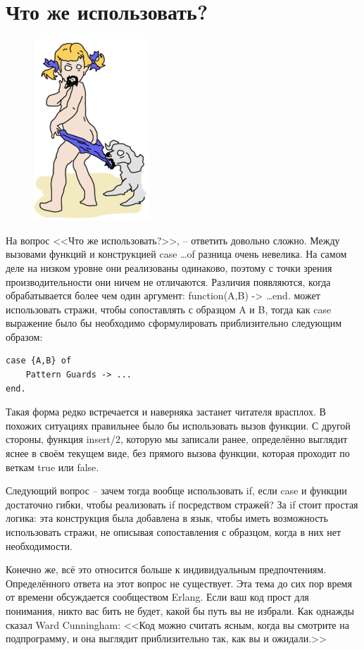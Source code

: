 \documentclass[a4paper,12pt]{report}
\newcommand{\ops}{\colorbox{lgreen}}
\begin{document}
\section{Что же использовать?}
\begin{figure}[h!]
    \includegraphics[width=0.3\linewidth]{coppertone.png}
\end{figure}
На вопрос <<Что же использовать?>>, \--- ответить довольно сложно. Между вызовами функций и конструкцией \ops{case \ldots of} разница очень невелика. На самом деле на низком уровне они реализованы одинаково, поэтому с точки зрения производительности они ничем не отличаются. Различия появляются, когда обрабатывается более чем один аргумент: \ops{function(A,B) -> \ldots end.} может использовать стражи, чтобы сопоставлять  с образцом A и B, тогда как case выражение было бы необходимо сформулировать приблизительно следующим образом:
\begin{lstlisting}[style=erlang]
case {A,B} of
    Pattern Guards -> ...
end.
\end{lstlisting}

Такая форма редко встречается и наверняка застанет читателя врасплох. В похожих ситуациях правильнее было бы использовать вызов функции. С другой стороны, функция \ops{insert/2}, которую мы записали ранее, определённо выглядит яснее в своём текущем виде, без прямого вызова функции, которая проходит по веткам \ops{true} или \ops{false}.

Следующий вопрос \--- зачем тогда вообще использовать \ops{if}, если \ops{case} и функции достаточно гибки, чтобы реализовать \ops{if} посредством стражей? За \ops{if} стоит простая логика: эта конструкция была добавлена в язык, чтобы иметь возможность использовать стражи, не описывая сопоставления с образцом, когда в них нет необходимости.

Конечно же, всё это относится больше к индивидуальным предпочтениям. Определённого ответа на этот вопрос не существует. Эта тема до сих пор время от времени обсуждается сообществом Erlang. Если ваш код прост для понимания, никто вас бить не будет, какой бы путь вы не избрали. Как однажды сказал Ward Cunningham: <<Код можно считать ясным, когда вы смотрите на подпрограмму, и она выглядит приблизительно так, как вы и ожидали.>>
\end{document}
